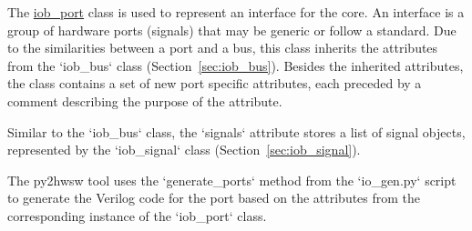 %

%
%

The \href{https://github.com/IObundle/py2hwsw/blob/main/py2hwsw/scripts/iob_port.py}{iob\_port} class is used to represent an interface for the core.
An interface is a group of hardware ports (signals) that may be generic or follow a standard.
Due to the similarities between a port and a bus, this class inherits the attributes from the `iob\_bus` class (Section~\ref{sec:iob_bus}).
Besides the inherited attributes, the class contains a set of new port specific attributes, each preceded by a comment describing the purpose of the attribute.


Similar to the `iob\_bus` class, the `signals` attribute stores a list of signal objects, represented by the `iob\_signal` class  (Section~\ref{sec:iob_signal}).

%
%

The py2hwsw tool uses the `generate\_ports` method from the `io\_gen.py` script to generate the Verilog code for the port based on the attributes from the corresponding instance of the `iob\_port` class.

